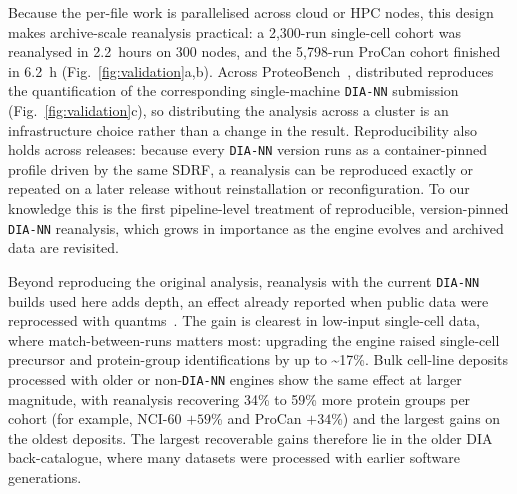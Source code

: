 \documentclass[preprint,12pt]{elsarticle}
\begin{document}
Because the per-file work is parallelised across cloud or HPC nodes, this design makes archive-scale reanalysis practical: a 2{,}300-run single-cell cohort was reanalysed in 2.2~hours on 300 nodes, and the 5{,}798-run ProCan cohort finished in 6.2~h (Fig.~\ref{fig:validation}a,b). Across ProteoBench~\cite{devreese2025proteobench}, distributed \quantmsdiann{} reproduces the quantification of the corresponding single-machine \texttt{DIA-NN} submission (Fig.~\ref{fig:validation}c), so distributing the analysis across a cluster is an infrastructure choice rather than a change in the result. Reproducibility also holds across releases: because every \texttt{DIA-NN} version runs as a container-pinned profile driven by the same SDRF, a reanalysis can be reproduced exactly or repeated on a later release without reinstallation or reconfiguration. To our knowledge this is the first pipeline-level treatment of reproducible, version-pinned \texttt{DIA-NN} reanalysis, which grows in importance as the engine evolves and archived data are revisited.

Beyond reproducing the original analysis, reanalysis with the current \texttt{DIA-NN} builds used here adds depth, an effect already reported when public data were reprocessed with quantms~\cite{dai2024quantms}. The gain is clearest in low-input single-cell data, where match-between-runs matters most: upgrading the engine raised single-cell precursor and protein-group identifications by up to \textasciitilde 17\%. Bulk cell-line deposits processed with older or non-\texttt{DIA-NN} engines show the same effect at larger magnitude, with reanalysis recovering 34\% to 59\% more protein groups per cohort (for example, NCI-60 $+59$\% and ProCan $+34$\%) and the largest gains on the oldest deposits. The largest recoverable gains therefore lie in the older DIA back-catalogue, where many datasets were processed with earlier software generations.
\end{document}
